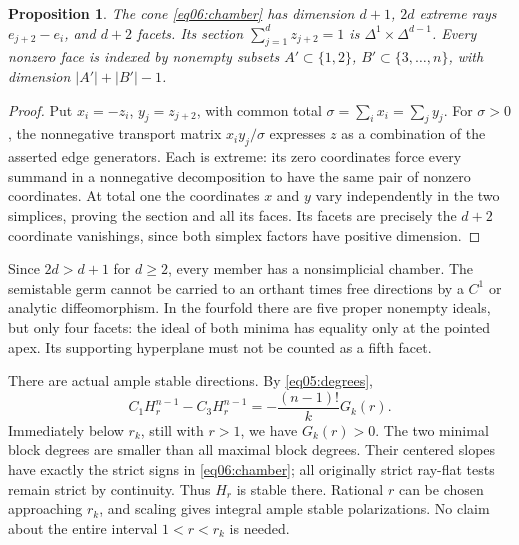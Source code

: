 \documentclass[11pt]{amsart}
\newtheorem{proposition}[theorem]{Proposition}
\theoremstyle{definition}
\theoremstyle{remark}
\begin{document}
\begin{proposition}\label{prop06:faces}
The cone \eqref{eq06:chamber} has dimension \(d+1\), \(2d\)
extreme rays \(e_{j+2}-e_i\), and \(d+2\) facets. Its section
\(\sum_{j=1}^dz_{j+2}=1\) is \(\Delta^1\times\Delta^{d-1}\).
Every nonzero face is indexed by nonempty subsets
\(A'\subset\{1,2\}\), \(B'\subset\{3,\ldots,n\}\), with
dimension \(|A'|+|B'|-1\).
\end{proposition}

\begin{proof}
Put \(x_i=-z_i\), \(y_j=z_{j+2}\), with common total
\(\sigma=\sum_ix_i=\sum_jy_j\). For \(\sigma>0\), the
nonnegative transport matrix \(x_i y_j/\sigma\) expresses \(z\)
as a combination of the asserted edge generators. Each is extreme:
its zero coordinates force every summand in a nonnegative
decomposition to have the same pair of nonzero coordinates.
At total one the coordinates \(x\) and \(y\) vary independently
in the two simplices, proving the section and all its faces.
Its facets are precisely the \(d+2\) coordinate vanishings, since
both simplex factors have positive dimension.
\end{proof}

Since \(2d>d+1\) for \(d\ge2\), every member has a nonsimplicial
chamber. The semistable germ cannot be carried to an orthant times
free directions by a \(C^1\) or analytic diffeomorphism. In the
fourfold there are five proper nonempty ideals, but only four facets:
the ideal of both minima has equality only at the pointed apex.
Its supporting hyperplane must not be counted as a fifth facet.

There are actual ample stable directions. By \eqref{eq05:degrees},
\begin{equation}\label{eq06:stablepath}
 C_1H_r^{n-1}-C_3H_r^{n-1}
       =-\frac{(n-1)!}{k}G_k(r).
\end{equation}
Immediately below \(r_k\), still with \(r>1\), we have \(G_k(r)>0\).
The two minimal block degrees are smaller than all maximal block
degrees. Their centered slopes have exactly the strict signs in
\eqref{eq06:chamber}; all originally strict ray-flat tests remain
strict by continuity. Thus \(H_r\) is stable there. Rational \(r\)
can be chosen approaching \(r_k\), and scaling gives integral ample
stable polarizations. No claim about the entire interval \(1<r<r_k\)
is needed.
\end{document}

